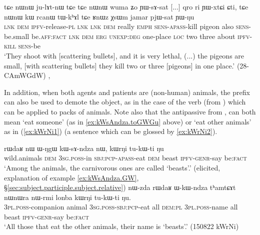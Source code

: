 \begin{exe}
\ex \label{ex:YWsAsat}
\gll tɕe nɯnɯ ju-lɤt-nɯ tɕe tɕe nɯnɯ wuma ʑo ɲɯ-sɤ-sat [...] qro ri ɲɯ-xtɕi ɕti, tɕe nɯnɯ kɯ rcanɯ tɯ-kʰɤl tɕe ʁnɯz χsɯm jamar pjɯ-sat ɲɯ-ŋu \\
\textsc{lnk} \textsc{dem} \textsc{ipfv}-release-\textsc{pl} \textsc{lnk} \textsc{lnk} \textsc{dem} really \textsc{emph} \textsc{sens}-\textsc{apass}-kill {  } pigeon also \textsc{sens}-be.small be.\textsc{aff}:\textsc{fact} \textsc{lnk} \textsc{dem} \textsc{erg} \textsc{unexp}:\textsc{deg} one-place \textsc{loc} two three about \textsc{ipfv}-\textsc{kill} \textsc{sens}-be  \\
\glt `They shoot with [scattering bullets], and it is very lethal, (...) the pigeons are small, [with scattering bullets] they kill two or three [pigeons] in one place.' (28-CAmWGdW) 	, 
\end{exe}

In addition, when both agents and patients are (non-human) animals, the prefix  can also be used to demote the object, as in the case of the verb  (from ) which can be applied to packs of animals. Note also that the antipassive  from , can both mean `eat someone' (as in \ref{ex:kWsAndza.toGWGu} above) or `eat other animals' as in (\ref{ex:kWrNi1}) (a sentence which can be glossed by \ref{ex:kWrNi2}).

\begin{exe}
\ex 
\begin{xlist}
\ex \label{ex:kWrNi1}
\gll rɯdaʁ nɯ ɯ-ŋgɯ kɯ-sɤ-ndza nɯ, kɯrŋi tu-kɯ-ti ŋu \\
wild.animals \textsc{dem} \textsc{3sg}.\textsc{poss}-in \textsc{sbj}:\textsc{pcp}-\textsc{apass}-eat \textsc{dem} beast \textsc{ipfv}-\textsc{genr}-say be:\textsc{fact} \\
\glt `Among the animals, the carnivorous ones are called `beasts'.' (elicited, explanation of example \ref{ex:kWsAndza.GW}, §\ref{sec:subject.participle.subject.relative})
\ex \label{ex:kWrNi2}
\gll nɯ-zda rɯdaʁ ɯ-kɯ-ndza tʰamtɕɤt nɯnɯra nɯ-rmi lonba kɯrŋi tu-kɯ-ti ŋu. \\
\textsc{3pl}.\textsc{poss}-companion animal \textsc{3sg}.\textsc{poss}-\textsc{sbj}:\textsc{pcp}-eat all \textsc{dem}:\textsc{pl} \textsc{3pl}.\textsc{poss}-name all beast \textsc{ipfv}-\textsc{genr}-say be:\textsc{fact} \\ 
\glt `All those that eat the other animals, their name is `beasts'.' (150822 kWrNi) 
\end{xlist}
\end{exe}


